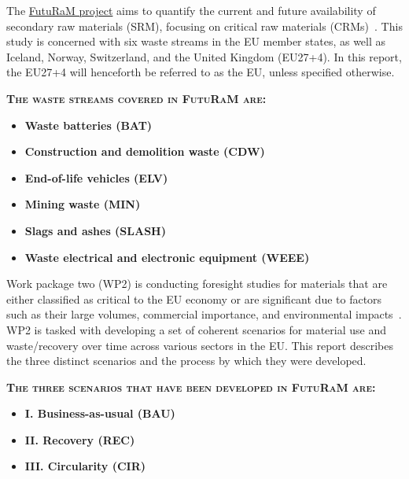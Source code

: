 
The \href{https://www.futuram.eu/}{FutuRaM project} aims to quantify the current and future availability of secondary raw materials (SRM), focusing on critical raw materials (CRMs)~\cite{graedel2015materials}. This study is concerned with six waste streams in the EU member states, as well as Iceland, Norway, Switzerland, and the United Kingdom (EU27+4). In this report, the EU27+4 will henceforth be referred to as the EU, unless specified otherwise.


{\large \textbf{\textsc{The waste streams covered in FutuRaM are:}}}
\begin{itemize}[leftmargin=4cm]
    \setlength{\itemsep}{1em} %
    \item[] \raisebox{0ex}{\iconBATT} \textbf{Waste batteries (BAT)}
    \item[] \raisebox{0ex}{\iconCDW} \textbf{Construction and demolition waste (CDW)}
    \item[] \raisebox{0ex}{\iconELV} \textbf{End-of-life vehicles (ELV)}
    \item[] \raisebox{0ex}{\iconMIN} \textbf{Mining waste (MIN)}
    \item[] \raisebox{0ex}{\iconSLASH} \textbf{Slags and ashes (SLASH)}
    \item[] \raisebox{0ex}{\iconWEEE} \textbf{Waste electrical and electronic equipment (WEEE)}
\end{itemize}



Work package two (WP2) is conducting foresight studies for materials that are either classified as critical to the EU economy or are significant due to factors such as their large volumes, commercial importance, and environmental impacts~\cite{eu2023crmact,eu2023crmstudy,eu2023crmqna,graedel2015materials}. WP2 is tasked with developing a set of coherent scenarios for material use and waste/recovery over time across various sectors in the EU. This report describes the three distinct scenarios and the process by which they were developed.



{\large \textbf{\textsc{The three scenarios that have been developed in FutuRaM are:}}}
\begin{itemize}[leftmargin=4cm]
    \setlength{\itemsep}{1em} %
    \item[] \iconBAU \textbf{I. Business-as-usual (BAU)}
    \item[] \iconREC \textbf{II. Recovery (REC)}
    \item[] \iconCIR \textbf{III. Circularity (CIR)}
\end{itemize}

